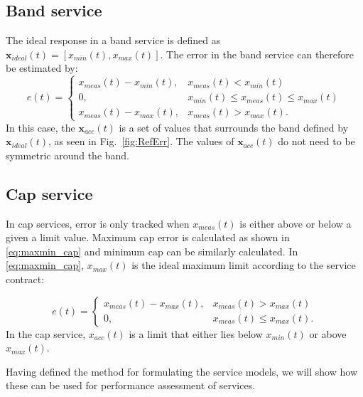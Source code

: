 \subsection*{Band service}
The ideal response in a band service is defined as $ \mathbf{x}_{ideal}(t)= [x_{min}(t),x_{max}(t)]$. The error in the band service can therefore be estimated by:
\begin{equation}\label{eq:band_error}
e(t)=
\begin{cases}
x_{meas}(t) - x_{min}(t) , & x_{meas}(t) < x_{min}(t)  \\
0, & x_{min}(t) \leq x_{meas}(t) \leq x_{max}(t) \\
x_{meas}(t) - x_{max}(t), & x_{meas}(t)  > x_{max}(t).  
\end{cases}
\end{equation}
In this case, the $\mathbf{x}_{acc}(t)$ is a set of values that surrounds the band defined by $ \mathbf{x}_{ideal}(t)$, as seen in Fig.~\ref{fig:RefErr}. The values of $\mathbf{x}_{acc}(t)$ do not need to be symmetric around the band.

\subsection*{Cap service}
In cap services, error is only tracked when $x_{meas}(t)$ is either above or below a given a limit value.
Maximum cap error is calculated as shown in \eqref{eq:maxmin_cap} and minimum cap can be similarly calculated. In \eqref{eq:maxmin_cap}, $x_{max}(t)$ is the ideal maximum limit according to the service contract:

\begin{equation}\label{eq:maxmin_cap}
e(t)=
\begin{cases}
x_{meas}(t)-x_{max}(t), & x_{meas}(t) > x_{max}(t) \\
0, & x_{meas}(t) \leq x_{max}(t).
\end{cases}
\end{equation}
In the cap service, $x_{acc}(t)$ is a limit that either lies below $x_{min}(t)$ or above $x_{max}(t)$.

Having defined the method for formulating the service models, we will show how these can be used for performance assessment of services.
